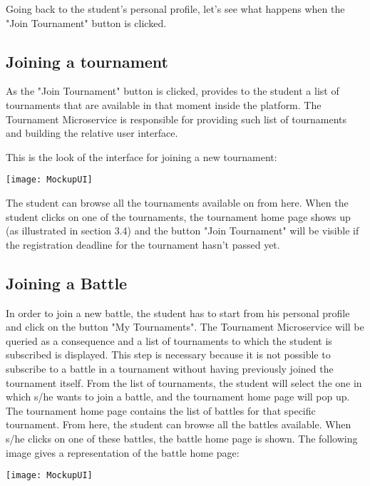 Going back to the student's personal profile, let's see what happens when the "Join Tournament" button is clicked. 


\begin{minipage}{\linewidth}

\subsection{Joining a tournament}
As the "Join Tournament" button is clicked, \app provides to the student a list of tournaments that are available in that moment inside the platform. The Tournament Microservice is responsible for providing such list of tournaments and building the relative user interface.

This is the look of the interface for joining a new tournament:

\begin{center}
	\texttt{[image: MockupUI]}
\end{center}

\end{minipage}

The student can browse all the tournaments available on \app from here. When the student clicks on one of the tournaments, the tournament home page shows up (as illustrated in section 3.4) and the button "Join Tournament" will be visible if the registration deadline for the tournament hasn't passed yet.


\begin{minipage}{\linewidth}
\subsection{Joining a Battle}
In order to join a new battle, the student has to start from his personal profile and click on the button "My Tournaments". The Tournament Microservice will be queried as a consequence and a list of tournaments to which the student is subscribed is displayed. This step is necessary because it is not possible to subscribe to a battle in a tournament without having previously joined the tournament itself.
From the list of tournaments, the student will select the one in which s/he wants to join a battle, and the tournament home page will pop up. The tournament home page contains the list of battles for that specific tournament. From here, the student can browse all the battles available. When s/he clicks on one of these battles, the battle home page is shown.
The following image gives a representation of the battle home page:

\begin{center}
	\texttt{[image: MockupUI]}
\end{center}

\end{minipage}

